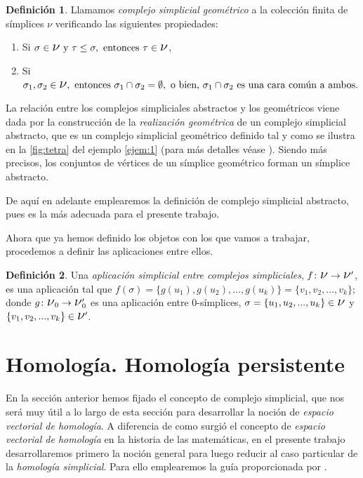 \documentclass[12pt, a4paper, twoside]{book}
\numberwithin{equation}{section}
\theoremstyle{definition}
\newtheorem{defi}{Definición}[section]
\theoremstyle{remark}
\theoremstyle{plain}
\begin{document}
	\begin{defi}
		Llamamos \textit{complejo simplicial geométrico} a la 
		colección finita de símplices {\Large $\nu$} verificando las
		siguientes propiedades:
		\begin{enumerate}
			\item Si $\sigma\in \text{{\Large $\nu$} y }
				\tau \leq \sigma, \text{ entonces }  \tau \in 
				\text{{\Large $\nu$}}$,
			\item Si $\sigma_{1},\sigma_{2} \in 
				\text{{\Large $\nu$}}, \text{ entonces } 
				\sigma_{1}\cap\sigma_{2}=\emptyset, 
				\text{ o bien, }
				\sigma_{1}\cap\sigma_{2} \text{ es una cara 
				común a ambos.}$
		\end{enumerate}
	\end{defi}
	
	La relación entre los complejos simpliciales abstractos y los 
	geométricos viene dada por la construcción de la \emph{realización
	geométrica} de un complejo simplicial abstracto, que es un complejo 
	simplicial geométrico definido tal y como se ilustra en la 
	\autoref{fig:tetra} del ejemplo \ref{ejem:1} (para más detalles véase 
	\cite{TopoAlg-Edelsbrunner}). Siendo más precisos, los conjuntos de 
	vértices de un símplice geométrico forman un símplice abstracto.

	De aquí en adelante emplearemos la definición de complejo simplicial 
	abstracto, pues es la más adecuada para el presente trabajo.

	Ahora que ya hemos definido los objetos con los que vamos a trabajar, 
	procedemos a definir las aplicaciones entre ellos.
	\begin{defi}
		Una \textit{aplicación simplicial entre complejos 
		simpliciales}, $f\colon\text{{\Large $\nu$}} \rightarrow 
		\text{{\Large $\nu$}$^{\prime}$}$, es una aplicación 
		tal que $f(\sigma)=\{g(u_{1}),g(u_{2}),...,g(u_{k})\}=
		\{v_{1},v_{2},...,v_{k}\}$; donde
		$g\colon\text{{\Large $\nu$}$_{0}$} \rightarrow \text{{\Large 
		$\nu$}$_{0}^{\prime}$}$ es una aplicación entre $0$-símplices,
		$\sigma=\{u_{1},u_{2},...,u_{k}\} \in \text{{\Large $\nu$}}$
		y $\{v_{1},v_{2},...,v_{k}\} \in \text{{\Large $\nu$}$^{
		\prime}$}$.	
	\end{defi}
	
	\section{Homología. Homología persistente}
	
	En la sección anterior hemos fijado el concepto de complejo 
	simplicial, que nos será muy útil a lo largo de esta sección para 
	desarrollar la noción de \emph{espacio vectorial de homología}. A 
	diferencia de como surgió el concepto de \emph{espacio vectorial de
	homología} en la historia de las matemáticas, en el presente trabajo 
	desarrollaremos primero la noción general para luego reducir al caso 
	particular de la \emph{homología simplicial}. Para ello emplearemos la 
	guía proporcionada por \cite{TopoAlg-Edelsbrunner,Homologia-Macho,
	Algebra-Elduque}.
\end{document}
